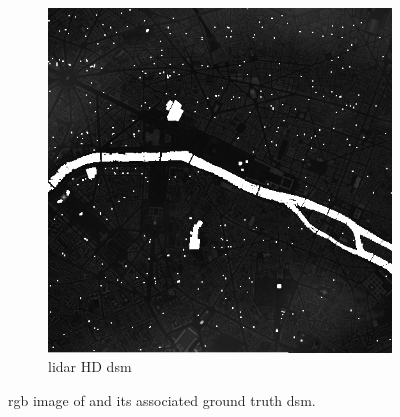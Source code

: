 \begin{figure}
\begin{subfigure}[t]{0.48\linewidth}
        \includegraphics[width=\linewidth]{Images/Chap_6/miniature_Paris_gt.png}
        \caption{\acrshort{lidar} HD \acrshort{dsm}}
        \label{fig:miniature_Paris_gt}
    \end{subfigure}
    \caption{\acrshort{rgb} image of  and its associated ground truth \acrshort{dsm}.}
    \label{fig:miniature_Paris}
\end{figure}

